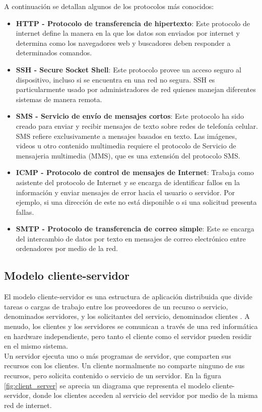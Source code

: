 A continuación se detallan algunos de los protocolos más conocidos:
\begin{itemize}
    \item \textbf{HTTP - Protocolo de transferencia de hipertexto}: Este protocolo de internet define la manera en la que los datos son enviados por internet y determina como los navegadores web y buscadores deben responder a determinados comandos.
    \item \textbf{SSH - Secure Socket Shell}: Este protocolo provee un acceso seguro al dispositivo, incluso si se encuentra en una red no segura. SSH es particularmente usado por administradores de red quienes manejan diferentes sistemas de manera remota.
    \item \textbf{SMS - Servicio de envío de mensajes cortos}: Este protocolo ha sido creado para enviar y recibir mensajes de texto sobre redes de telefonía celular. SMS refiere exclusivamente a mensajes basados en texto. Las imágenes, videos u otro contenido multimedia requiere el protocolo de Servicio de mensajeria multimedia (MMS), que es una extensión del protocolo SMS.
    \item \textbf{ICMP - Protocolo de control de mensajes de Internet}: Trabaja como asistente del protocolo de Internet y se encarga de identificar fallos en la información y enviar mensajes de error hacia el usuario o servidor. Por ejemplo, si una dirección de este no está disponible o si una solicitud presenta fallas.
    \item \textbf{SMTP - Protocolo de transferencia de correo simple}: Este se encarga del intercambio de datos por texto en mensajes de correo electrónico entre ordenadores por medio de la red.
\end{itemize}

\subsection{Modelo cliente-servidor}
El modelo cliente-servidor es una estructura de aplicación distribuida que divide tareas o cargas de trabajo entre los proveedores de un recurso o servicio, denominados servidores, y los solicitantes del servicio, denominados clientes \cite{wikipedia:cliente_servidor}. A menudo, los clientes y los servidores se comunican a través de una red informática en hardware independiente, pero tanto el cliente como el servidor pueden residir en el mismo sistema.\\

Un servidor ejecuta uno o más programas de servidor, que comparten sus recursos con los clientes. Un cliente normalmente no comparte ninguno de sus recursos, pero solicita contenido o servicio de un servidor. En la figura \ref{fig:client_server} se aprecia un diagrama que representa el modelo cliente-servidor, donde los clientes acceden al servicio del servidor por medio de la misma red de internet.\\

